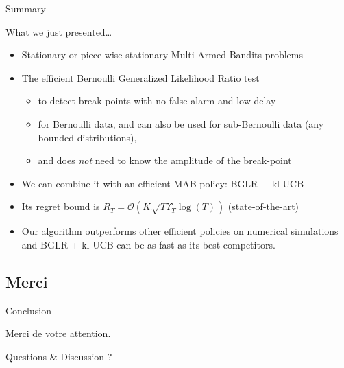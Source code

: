 \documentclass[11pt,french,ignorenonframetext,]{beamer}
\newcommand{\Fontify}{}
\providecommand{\tightlist}{%
  \setlength{\itemsep}{0pt}\setlength{\parskip}{0pt}}
\begin{document}
\begin{frame}{Summary}

  What we just presented\ldots{}
  \begin{itemize}
    \item
    Stationary or \alert{piece-wise stationary} Multi-Armed Bandits problems
    \item
    The efficient Bernoulli Generalized Likelihood Ratio test \dCooley{}
    \begin{itemize}\tightlist
      \item
      to detect break-points with \alert{no false alarm} and \alert{low delay}
      \item
      for Bernoulli data, and can also be used for sub-Bernoulli data (any bounded distributions),
      \item
      and does \emph{not} need to know the amplitude of the break-point
    \end{itemize}
    \item
    We can combine it with an efficient MAB policy:
    \alert{BGLR + kl-UCB}  \dCooley{}
    \item
    Its regret bound is $R_T = \mathcal{O}(K \sqrt{T \Upsilon_T \log(T)})$  \dCooley{} (state-of-the-art)
    \item
    Our algorithm outperforms other efficient policies on numerical simulations \dCooley\\
    and BGLR + kl-UCB can be as fast as its best competitors.
  \end{itemize}

\end{frame}

\subsection{Merci}
\begin{frame}{Conclusion}

\begin{center}
  \begin{Large}
    {\Fontify Merci de votre attention.}
    \Innocey[1.2]
  \end{Large}
\end{center}

\vspace*{20pt}

\begin{center}
  \begin{Large}
    Questions \& Discussion ?
  \end{Large}
\end{center}

\end{frame}
\end{document}

